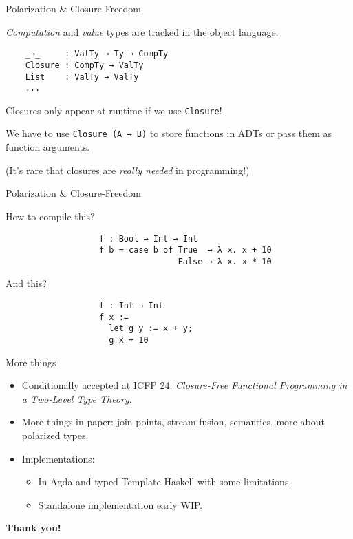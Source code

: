 \documentclass[dvipsnames,aspectratio=169]{beamer}
\newcommand{\ttt}[1]{{\texttt{#1}}}
\theoremstyle{remark}
\begin{document}
\begin{frame}[fragile]{Polarization \& Closure-Freedom}

\emph{Computation} and \emph{value} types are tracked
in the object language.
\begin{verbatim}
    _→_     : ValTy → Ty → CompTy
    Closure : CompTy → ValTy
    List    : ValTy → ValTy
    ...
\end{verbatim}

Closures only appear at runtime if we use \texttt{Closure}!
\vspace{1em}

We have to use \ttt{Closure (A → B)} to store functions in ADTs
or pass them as function arguments.
\vspace{1em}

(It's rare that closures are \emph{really needed} in programming!)

\end{frame}

\begin{frame}[fragile]{Polarization \& Closure-Freedom}

How to compile this?
\vspace{1em}
\begin{verbatim}
                   f : Bool → Int → Int
                   f b = case b of True  → λ x. x + 10
                                   False → λ x. x * 10
\end{verbatim}
And this?
\begin{verbatim}
                   f : Int → Int
                   f x :=
                     let g y := x + y;
                     g x + 10
\end{verbatim}
\end{frame}

\begin{frame}{More things}

\begin{itemize}
  \item Conditionally accepted at ICFP 24: \emph{Closure-Free Functional Programming in a Two-Level Type Theory}.
  \item More things in paper: join points, stream fusion, semantics, more about polarized types.
  \item Implementations:
    \begin{itemize}
      \item In Agda and typed Template Haskell with some limitations.
      \item Standalone implementation early WIP.
    \end{itemize}
\end{itemize}
\vspace{2em}

\begin{center}

  \Large{\textbf{Thank you!}}

\end{center}

\end{frame}
\end{document}
